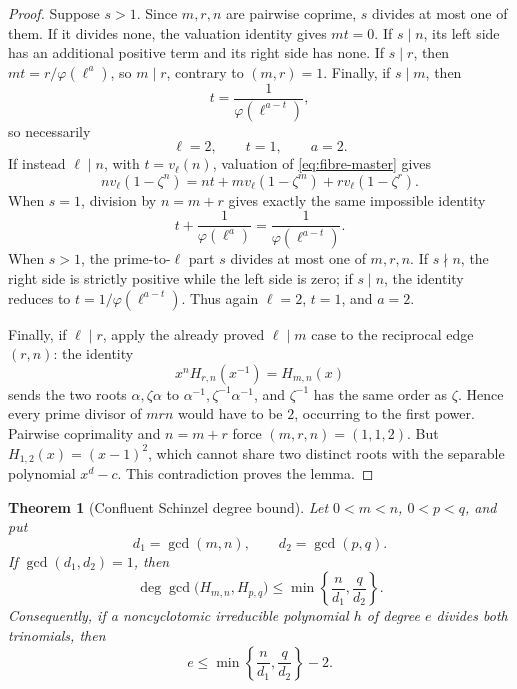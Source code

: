 \documentclass[11pt]{article}
\newtheorem{theorem}{Theorem}[section]
\theoremstyle{definition}
\begin{document}
\begin{proof}
Suppose \(s>1\).  Since \(m,r,n\) are pairwise coprime, \(s\) divides at
most one of them.  If it divides none, the valuation identity gives
\(mt=0\).  If \(s\mid n\), its left side has an additional positive term
and its right side has none.  If \(s\mid r\), then
\(mt=r/\varphi(\ell^a)\), so \(m\mid r\), contrary to \((m,r)=1\).
Finally, if \(s\mid m\), then
\[
 t=\frac1{\varphi(\ell^{a-t})},
\]
so necessarily
\[
 \ell=2,\qquad t=1,\qquad a=2.
\]
If instead \(\ell\mid n\), with \(t=v_\ell(n)\), valuation of
\eqref{eq:fibre-master} gives
\[
 n v_\ell(1-\zeta^n)
 =nt+m v_\ell(1-\zeta^m)+r v_\ell(1-\zeta^r).
\]
When \(s=1\), division by \(n=m+r\) gives exactly the same impossible
identity
\[
 t+\frac1{\varphi(\ell^a)}
 =\frac1{\varphi(\ell^{a-t})}.
\]
When \(s>1\), the prime-to-\(\ell\) part \(s\) divides at most one of
\(m,r,n\).  If \(s\nmid n\), the right side is strictly positive while the
left side is zero; if \(s\mid n\), the identity reduces to
\(t=1/\varphi(\ell^{a-t})\).  Thus again
\(\ell=2\), \(t=1\), and \(a=2\).

Finally, if \(\ell\mid r\), apply the already proved \(\ell\mid m\) case to
the reciprocal edge \((r,n)\): the identity
\[
 x^nH_{r,n}(x^{-1})=H_{m,n}(x)
\]
sends the two roots \(\alpha,\zeta\alpha\) to
\(\alpha^{-1},\zeta^{-1}\alpha^{-1}\), and \(\zeta^{-1}\) has the same
order as \(\zeta\).  Hence every prime divisor of \(mrn\) would have to be
\(2\), occurring to the first power.  Pairwise coprimality and \(n=m+r\)
force \((m,r,n)=(1,1,2)\).  But
\(H_{1,2}(x)=(x-1)^2\), which cannot share two distinct roots with the
separable polynomial \(x^d-c\).  This contradiction proves the lemma.
\end{proof}

\begin{theorem}[Confluent Schinzel degree bound]
\label{thm:schinzelbound}
Let \(0<m<n\), \(0<p<q\), and put
\[
 d_1=\gcd(m,n),\qquad d_2=\gcd(p,q).
\]
If \(\gcd(d_1,d_2)=1\), then
\begin{equation}
 \deg\gcd\bigl(H_{m,n},H_{p,q}\bigr)
 \leq
 \min\left\{\frac n{d_1},\frac q{d_2}\right\}.
 \tag{14.1}
\end{equation}
Consequently, if a noncyclotomic irreducible polynomial \(h\) of degree
\(e\) divides both trinomials, then
\begin{equation}
 e\leq
 \min\left\{\frac n{d_1},\frac q{d_2}\right\}-2.
 \tag{14.2}
\end{equation}
\end{theorem}
\end{document}
